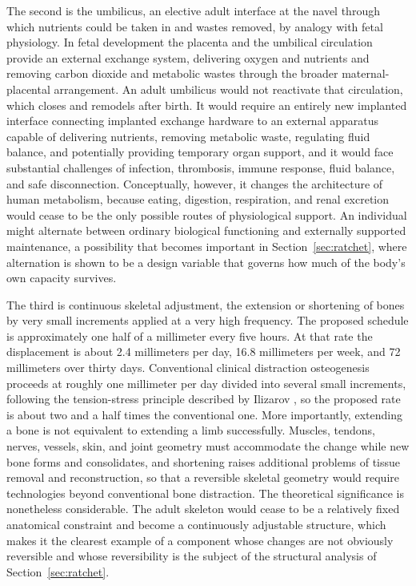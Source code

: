 \documentclass[11pt]{article}
\theoremstyle{plain}
\theoremstyle{definition}
\theoremstyle{remark}
\begin{document}
The second is the umbilicus, an elective adult interface at the navel through which nutrients could be taken in and wastes removed, by analogy with fetal physiology. In fetal development the placenta and the umbilical circulation provide an external exchange system, delivering oxygen and nutrients and removing carbon dioxide and metabolic wastes through the broader maternal-placental arrangement. An adult umbilicus would not reactivate that circulation, which closes and remodels after birth. It would require an entirely new implanted interface connecting implanted exchange hardware to an external apparatus capable of delivering nutrients, removing metabolic waste, regulating fluid balance, and potentially providing temporary organ support, and it would face substantial challenges of infection, thrombosis, immune response, fluid balance, and safe disconnection. Conceptually, however, it changes the architecture of human metabolism, because eating, digestion, respiration, and renal excretion would cease to be the only possible routes of physiological support. An individual might alternate between ordinary biological functioning and externally supported maintenance, a possibility that becomes important in Section~\ref{sec:ratchet}, where alternation is shown to be a design variable that governs how much of the body's own capacity survives.

The third is continuous skeletal adjustment, the extension or shortening of bones by very small increments applied at a very high frequency. The proposed schedule is approximately one half of a millimeter every five hours. At that rate the displacement is about 2.4 millimeters per day, 16.8 millimeters per week, and 72 millimeters over thirty days. Conventional clinical distraction osteogenesis proceeds at roughly one millimeter per day divided into several small increments, following the tension-stress principle described by Ilizarov \cite{ilizarov1989}, so the proposed rate is about two and a half times the conventional one. More importantly, extending a bone is not equivalent to extending a limb successfully. Muscles, tendons, nerves, vessels, skin, and joint geometry must accommodate the change while new bone forms and consolidates, and shortening raises additional problems of tissue removal and reconstruction, so that a reversible skeletal geometry would require technologies beyond conventional bone distraction. The theoretical significance is nonetheless considerable. The adult skeleton would cease to be a relatively fixed anatomical constraint and become a continuously adjustable structure, which makes it the clearest example of a component whose changes are not obviously reversible and whose reversibility is the subject of the structural analysis of Section~\ref{sec:ratchet}.
\end{document}
